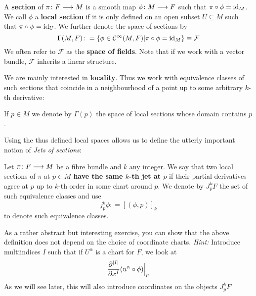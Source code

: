\begin{definition}
  A \textbf{section} of $\pi\colon F \longrightarrow M$ is a smooth map $\phi\colon  M \lra F$ such that $\pi \circ \phi = \id_M$. We call $\phi$ a \textbf{local section} if it is only defined on an open subset $U \subseteq M$ such that $\pi \circ \phi = \id_U$. We further denote the space of sections by $$\Gamma(M,F)\colon = \{ \phi \in \Ci(M,F) | \pi \circ \phi = \id_M \} \equiv \mathcal{F}$$
  We often refer to $\mathcal{F}$ as the \textbf{space of fields}. Note that if we work with a vector bundle, $\mathcal{F}$ inherits a linear structure.
\end{definition}

We are mainly interested in \textbf{locality}. Thus we work with equivalence classes of such sections that coincide in a neighbourhood of a point up to some arbitrary $k$-th derivative:

\begin{definition}
  If $p \in M$ we denote by $\Gamma(p)$ the space of local sections whose domain contains $p$.
\end{definition}

Using the thus defined local spaces allows us to define the utterly important notion of \emph{Jets of sections}:

\begin{definition}
\label{def:Jets_sections}
Let $\pi\colon F\longrightarrow M$ be a fibre bundle and $k$ any integer. We say that two local sections of $\pi$ at $p \in M$ \textbf{have the same $k$-th jet at $p$} if their partial derivatives agree at $p$ up to $k$-th order in some chart around $p$. We denote by $J^k_p F$ the set of such equivalence classes and use
$$ j^k_p \phi \colon = [(\phi, p)]_k $$
to denote such equivalence classes.
\end{definition}

\begin{rem}
As a rather abstract but interesting exercise, you can show that the above definition does not depend on the choice of coordinate charts. \emph{Hint:} Introduce multiindices $I$ such that if $U^\alpha$ is a chart for $F$, we look at
$$ \dell{^{|I|}}{x^I} (u^\alpha \circ \phi) \Big|_p $$
As we will see later, this will also introduce coordinates on the objects $J^k_p F$
\end{rem}

